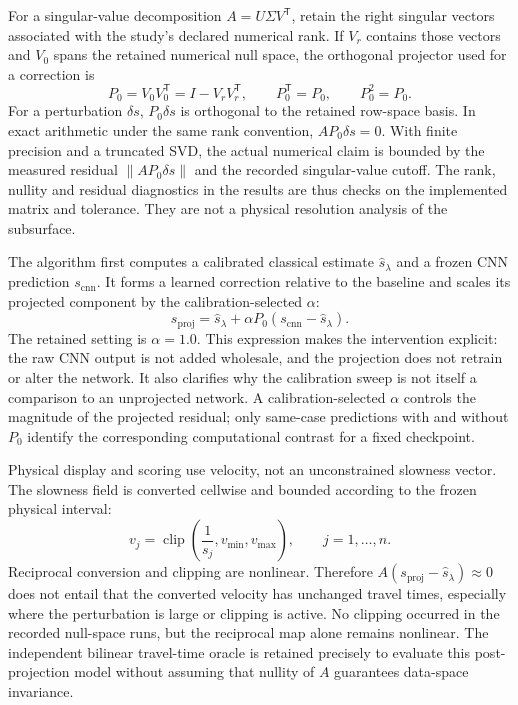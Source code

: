 \documentclass[11pt]{article}
\newcounter{algorithm}
\begin{document}
For a singular-value decomposition $A=U\Sigma V^{\mathsf T}$, retain the right singular vectors associated with the study's declared numerical rank. If $V_r$ contains those vectors and $V_0$ spans the retained numerical null space, the orthogonal projector used for a correction is
\begin{equation}\label{eq:nullspace-projector}
P_0=V_0V_0^{\mathsf T}=I-V_rV_r^{\mathsf T},\qquad P_0^{\mathsf T}=P_0,\qquad P_0^2=P_0.
\end{equation}
For a perturbation $\delta s$, $P_0\delta s$ is orthogonal to the retained row-space basis. In exact arithmetic under the same rank convention, $AP_0\delta s=0$. With finite precision and a truncated SVD, the actual numerical claim is bounded by the measured residual $\|AP_0\delta s\|$ and the recorded singular-value cutoff. The rank, nullity and residual diagnostics in the results are thus checks on the implemented matrix and tolerance. They are not a physical resolution analysis of the subsurface.

The algorithm first computes a calibrated classical estimate $\hat{s}_{\lambda}$ and a frozen CNN prediction $s_{\mathrm{cnn}}$. It forms a learned correction relative to the baseline and scales its projected component by the calibration-selected $\alpha$:
\begin{equation}\label{eq:projected-slowness}
s_{\mathrm{proj}}=\hat{s}_{\lambda}+\alpha P_0(s_{\mathrm{cnn}}-\hat{s}_{\lambda}).
\end{equation}
The retained setting is $\alpha=1.0$. This expression makes the intervention explicit: the raw CNN output is not added wholesale, and the projection does not retrain or alter the network. It also clarifies why the calibration sweep is not itself a comparison to an unprojected network. A calibration-selected $\alpha$ controls the magnitude of the projected residual; only same-case predictions with and without $P_0$ identify the corresponding computational contrast for a fixed checkpoint.

Physical display and scoring use velocity, not an unconstrained slowness vector. The slowness field is converted cellwise and bounded according to the frozen physical interval:
\begin{equation}\label{eq:slowness-velocity}
v_j=\operatorname{clip}\!\left(\frac{1}{s_j},v_{\min},v_{\max}\right),\qquad j=1,\ldots,n.
\end{equation}
Reciprocal conversion and clipping are nonlinear. Therefore $A(s_{\mathrm{proj}}-\hat{s}_{\lambda})\approx0$ does not entail that the converted velocity has unchanged travel times, especially where the perturbation is large or clipping is active. No clipping occurred in the recorded null-space runs, but the reciprocal map alone remains nonlinear. The independent bilinear travel-time oracle is retained precisely to evaluate this post-projection model without assuming that nullity of $A$ guarantees data-space invariance.
\end{document}
